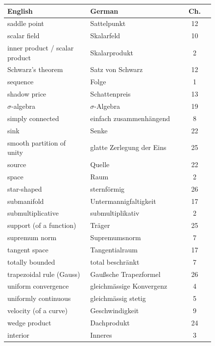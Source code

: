 \begin{center}
\begin{tabular}{@{}p{0.40\linewidth} p{0.44\linewidth} c@{}}
\textbf{English} & \textbf{German} & \textbf{Ch.} \\
\hline
saddle point & Sattelpunkt & 12 \\
scalar field & Skalarfeld & 10 \\
inner product / scalar product & Skalarprodukt & 2 \\
Schwarz's theorem & Satz von Schwarz & 12 \\
sequence & Folge & 1 \\
shadow price & Schattenpreis & 13 \\
$\sigma$-algebra & $\sigma$-Algebra & 19 \\
simply connected & einfach zusammenhängend & 8 \\
sink & Senke & 22 \\
smooth partition of unity & glatte Zerlegung der Eins & 25 \\
source & Quelle & 22 \\
space & Raum & 2 \\
star-shaped & sternförmig & 26 \\
submanifold & Untermannigfaltigkeit & 17 \\
submultiplicative & submultiplikativ & 2 \\
support (of a function) & Träger & 25 \\
supremum norm & Supremumsnorm & 7 \\
tangent space & Tangentialraum & 17 \\
totally bounded & total beschränkt & 7 \\
trapezoidal rule (Gauss) & Gaußsche Trapezformel & 26 \\
uniform convergence & gleichmässige Konvergenz & 4 \\
uniformly continuous & gleichmässig stetig & 5 \\
velocity (of a curve) & Geschwindigkeit & 9 \\
wedge product & Dachprodukt & 24 \\
interior & Inneres & 3 \\
\end{tabular}
\end{center}

